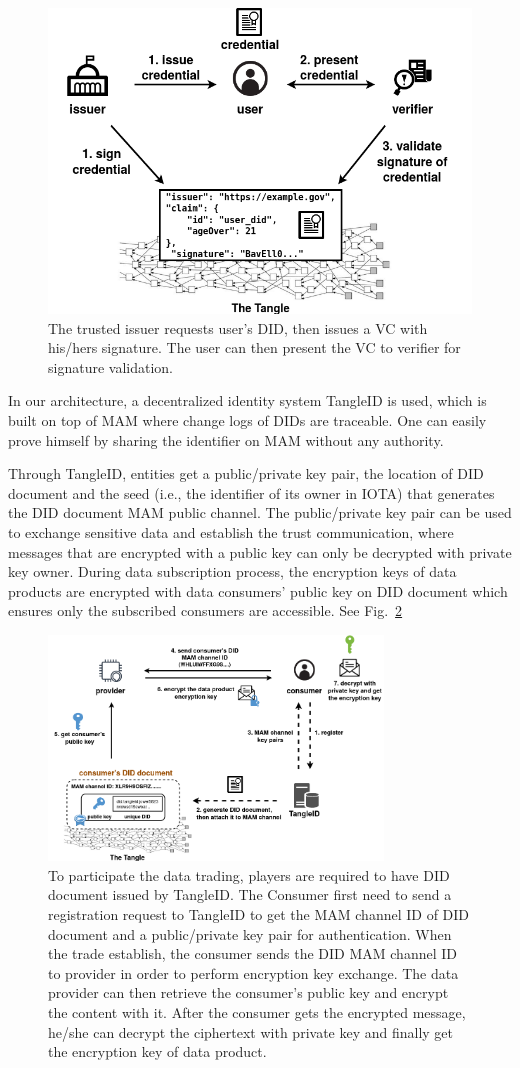 \documentclass[conference]{IEEEtran}
\begin{document}
\begin{figure}[h]
    \centering
    \includegraphics[width=3.in]{DID_VC}
    \caption{The trusted issuer requests user's DID, then issues a VC with his/hers signature. The user can then present the VC to verifier for signature validation.}
    \label{fig:did_vc}
\end{figure}

In our architecture, a decentralized identity system TangleID\cite{TangleID} is used, which is built on top of MAM where change logs of DIDs are traceable. One can easily prove himself by sharing the identifier on MAM without any authority.

Through TangleID, entities get a public/private key pair, the location of DID document and the seed (i.e., the identifier of its owner in IOTA) that generates the DID document MAM public channel. The public/private key pair can be used to exchange sensitive data and establish the trust communication, where messages that are encrypted with a public key can only be decrypted with private key owner. During data subscription process, the encryption keys of data products are encrypted with data consumers' public key on DID document which ensures only the subscribed consumers are accessible. See Fig.~\ref{fig:TangleID}

\begin{figure}[h]
    \centering
    \includegraphics[width=3.5in]{TangleID}
    \caption{To participate the data trading, players are required to have DID document issued by TangleID. The Consumer first need to send a registration request to TangleID to get the MAM channel ID of DID document and a public/private key pair for authentication. When the trade establish, the consumer sends the DID MAM channel ID to provider in order to perform encryption key exchange. The data provider can then retrieve the consumer's public key and encrypt the content with it. After the consumer gets the encrypted message, he/she can decrypt the ciphertext with private key and finally get the encryption key of data product.}
    \label{fig:TangleID}
\end{figure}
\end{document}
